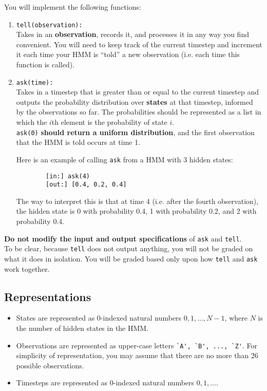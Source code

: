 \documentclass{article}
\begin{document}
    You will implement the following functions:
    \begin{enumerate}
        \item \texttt{tell(observation):} \\
        Takes in an \textbf{observation}, records it, and processes it in any way you find convenient.
        You will need to keep track of the current timestep and increment it each time your HMM is ``told'' a new observation (i.e. each time this function is called).

        \item \texttt{ask(time):} \\
        Takes in a timestep that is greater than or equal to the current timestep and outputs the probability distribution over \textbf{states} at that timestep, informed by the observations so far.
        The probabilities should be represented as a list in which the $i$th element is the probability of state $i$. ~\\

        \verb|ask(0)| \textbf{should return a uniform distribution}, and the first observation that the HMM is told occurs at time 1.

        Here is an example of calling \verb|ask| from a HMM with 3 hidden states:
        \begin{verbatim}
        [in:] ask(4)
        [out:] [0.4, 0.2, 0.4]
        \end{verbatim}
        The way to interpret this is that at time 4 (i.e. after the fourth observation), the hidden state is 0 with probability 0.4, 1 with probability 0.2, and 2 with probability 0.4.

    \end{enumerate}

    \textbf{Do not modify the input and output specifications} of \verb|ask| and \verb|tell|. ~\\

    To be clear, because \verb|tell| does not output anything, you will not be graded on what it does in isolation.
    You will be graded based only upon how \verb|tell| and \verb|ask| work together. ~\\



    \subsection{Representations}
    \begin{itemize}
        \item States are represented as 0-indexed natural numbers $0, 1, \ldots, N - 1$, where $N$ is the number of hidden states in the HMM.
        \item Observations are represented as upper-case letters \verb|`A', `B', ..., `Z'|.
        For simplicity of representation, you may assume that there are no more than 26 possible observations.
        \item Timesteps are represented as 0-indexed natural numbers $0, 1, \ldots$.
    \end{itemize}
\end{document}
